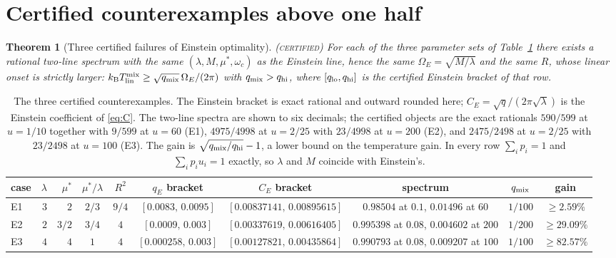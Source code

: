 \documentclass[11pt]{article}
\newcommand{\kb}{k_{\mathrm B}}
\newcommand{\Tlin}{T_{\mathrm{lin}}}
\newcommand{\OmE}{\Omega_E}
\newcommand{\CE}{C_E}
\newcommand{\muS}{\mu^{*}}
\newtheorem{theorem}{Theorem}[section]
\theoremstyle{definition}
\theoremstyle{remark}
\newcommand{\certified}{\textnormal{\textsc{(certified)}}}
\begin{document}
\section{Certified counterexamples above one half}\label{sec:cert}

\begin{theorem}[Three certified failures of Einstein optimality]\label{thm:cert}\certified
For each of the three parameter sets of Table~\ref{tab:cex} there exists a rational
two-line spectrum with the same $(\lambda,M,\muS,\omega_c)$ as the Einstein line, hence
the same $\OmE=\sqrt{M/\lambda}$ and the same $R$, whose linear onset is strictly larger:
$\kb\Tlin^{\rm mix}\ge\sqrt{q_{\rm mix}}\,\OmE/(2\pi)$ with $q_{\rm mix}>q_{\rm hi}$, where
$[q_{\rm lo},q_{\rm hi}]$ is the certified Einstein bracket of that row.
\end{theorem}

\begin{table}[t]
\centering
\scriptsize
\setlength{\tabcolsep}{3pt}
\renewcommand{\arraystretch}{1.15}
\begin{tabular}{@{}lrrccccccc@{}}
\toprule
case & $\lambda$ & $\muS$ & $\muS/\lambda$ & $R^2$ & $q_E$ bracket & $\CE$ bracket &
spectrum & $q_{\rm mix}$ & gain\\
\midrule
E1 & $3$ & $2$ & $2/3$ & $9/4$ & $[0.0083,\,0.0095]$ & $[0.00837141,\,0.00895615]$ &
$0.98504$ at $0.1$, $0.01496$ at $60$ & $1/100$ & $\ge2.59\%$\\
E2 & $2$ & $3/2$ & $3/4$ & $4$ & $[0.0009,\,0.003]$ & $[0.00337619,\,0.00616405]$ &
$0.995398$ at $0.08$, $0.004602$ at $200$ & $1/200$ & $\ge29.09\%$\\
E3 & $4$ & $4$ & $1$ & $4$ & $[0.000258,\,0.003]$ & $[0.00127821,\,0.00435864]$ &
$0.990793$ at $0.08$, $0.009207$ at $100$ & $1/100$ & $\ge82.57\%$\\
\bottomrule
\end{tabular}
\caption{The three certified counterexamples. The Einstein bracket is exact rational and
outward rounded here; $C_E=\sqrt{q}/(2\pi\sqrt\lambda)$ is the Einstein coefficient of
\eqref{eq:C}. The two-line spectra are shown to six decimals; the certified objects are
the exact rationals $590/599$ at $u=1/10$ together with $9/599$ at $u=60$ (E1),
$4975/4998$ at $u=2/25$ with $23/4998$ at $u=200$ (E2), and $2475/2498$ at $u=2/25$ with
$23/2498$ at $u=100$ (E3). The gain is
$\sqrt{q_{\rm mix}/q_{\rm hi}}-1$, a lower bound on the temperature gain. In every row
$\sum_ip_i=1$ and $\sum_ip_iu_i=1$ exactly, so $\lambda$ and $M$ coincide with
Einstein's.}
\label{tab:cex}
\end{table}
\end{document}
